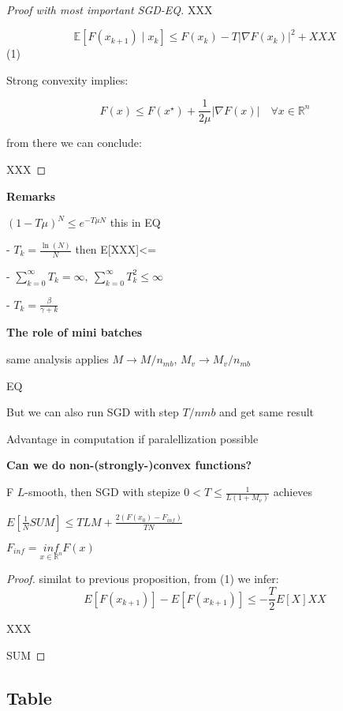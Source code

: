 \begin{proof}[Proof with most important SGD-EQ]

	XXX

	$$\mathbb{E} [F(x_{k+1})\mid x_k]\le F(x_k) -T |\nabla F(x_k)|^2 + XXX$$ (1)

	Strong convexity implies:

	$$ F(x) \le F(x^\star) + \frac{1}{2\mu}|\nabla F(x)|\quad \forall{x \in \mathbb{R}^{n}} $$

	from there we can conclude:

	XXX

\end{proof}


\textbf{Remarks}

$(1-T\mu)^N\le e^{-T\mu N}$ this  in EQ

- $T_k=\frac{\ln(N)}{N}$ then E[XXX]<=

- $\sum_{k=0}^{\infty}T_k = \infty,\ \sum_{k=0}^{\infty}T_k^2 \le \infty$

- $T_k=\frac{\beta}{\gamma+k}$

\textbf{The role of mini batches}

same analysis applies $M \rightarrow{M/n_{mb}}$, $M_v \rightarrow{M_v/n_{mb}}$

EQ

But we can also run SGD with step $T/n{mb}$ and get same result

Advantage in computation if paralellization possible

\textbf{Can we do non-(strongly-)convex functions? }

\begin{proposition}
	F $L$-smooth, then SGD with  stepize $0<T\le \frac{1}{L(1+M_v)}$ achieves

	$E[\frac{1}{N}SUM]\le TLM + \frac{2(F(x_0)-F_{inf})}{TN}$


	$F_{inf} = \underset{x \in \mathcal{\mathbb{R}}^n}{inf}F(x)$
\end{proposition}

\begin{proof}[Proof] similat to  previous proposition, from (1) we infer:
	$$E[F(x_{k+1})]-E[F(x_{k+1})]\le -\frac{T}{2}E[X]XX$$

	XXX

	SUM

\end{proof}

\subsection{Table}
